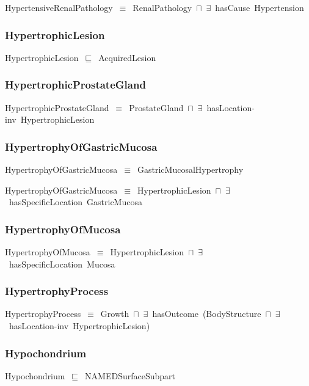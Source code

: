 \documentclass{article}
\begin{document}
HypertensiveRenalPathology~\ensuremath{\equiv}~RenalPathology~\ensuremath{\sqcap}~\ensuremath{\exists}~hasCause~Hypertension

\subsubsection*{HypertrophicLesion}

HypertrophicLesion~\ensuremath{\sqsubseteq}~AcquiredLesion~

\subsubsection*{HypertrophicProstateGland}

HypertrophicProstateGland~\ensuremath{\equiv}~ProstateGland~\ensuremath{\sqcap}~\ensuremath{\exists}~hasLocation-inv~HypertrophicLesion

\subsubsection*{HypertrophyOfGastricMucosa}

HypertrophyOfGastricMucosa~\ensuremath{\equiv}~GastricMucosalHypertrophy

HypertrophyOfGastricMucosa~\ensuremath{\equiv}~HypertrophicLesion~\ensuremath{\sqcap}~\ensuremath{\exists}~hasSpecificLocation~GastricMucosa

\subsubsection*{HypertrophyOfMucosa}

HypertrophyOfMucosa~\ensuremath{\equiv}~HypertrophicLesion~\ensuremath{\sqcap}~\ensuremath{\exists}~hasSpecificLocation~Mucosa

\subsubsection*{HypertrophyProcess}

HypertrophyProcess~\ensuremath{\equiv}~Growth~\ensuremath{\sqcap}~\ensuremath{\exists}~hasOutcome~(BodyStructure~\ensuremath{\sqcap}~\ensuremath{\exists}~hasLocation-inv~HypertrophicLesion)

\subsubsection*{Hypochondrium}

Hypochondrium~\ensuremath{\sqsubseteq}~NAMEDSurfaceSubpart~
\end{document}
